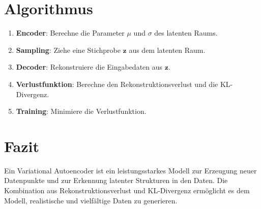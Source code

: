 \documentclass{article}
\begin{document}
	\section{Algorithmus}
	\begin{enumerate}
		\item \textbf{Encoder}: Berechne die Parameter \(\mu\) und \(\sigma\) des latenten Raums.
		\item \textbf{Sampling}: Ziehe eine Stichprobe \(\mathbf{z}\) aus dem latenten Raum.
		\item \textbf{Decoder}: Rekonstruiere die Eingabedaten aus \(\mathbf{z}\).
		\item \textbf{Verlustfunktion}: Berechne den Rekonstruktionsverlust und die KL-Divergenz.
		\item \textbf{Training}: Minimiere die Verlustfunktion.
	\end{enumerate}
	
	\section{Fazit}
	Ein Variational Autoencoder ist ein leistungsstarkes Modell zur Erzeugung neuer Datenpunkte und zur Erkennung latenter Strukturen in den Daten. Die Kombination aus Rekonstruktionsverlust und KL-Divergenz ermöglicht es dem Modell, realistische und vielfältige Daten zu generieren.
	
\end{document}
